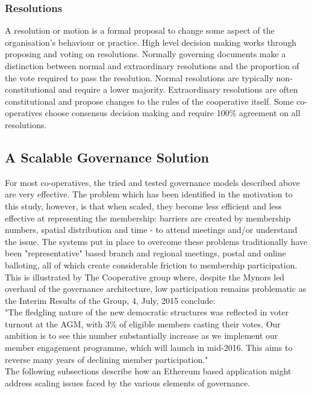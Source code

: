\subsubsection{Resolutions}
A resolution or motion is a formal proposal to change some aspect of the organisation's behaviour or practice. High level decision making works through proposing and voting on resolutions. Normally governing documents make a distinction between normal and extraordinary resolutions and the proportion of the vote required to pass the resolution. Normal resolutions are typically non-constitutional and require a lower majority. Extraordinary resolutions are often constitutional and propose changes to the rules of the cooperative itself. Some co-operatives choose consensus decision making and require 100\% agreement on all resolutions.

\subsection{A Scalable Governance Solution}
For most co-operatives, the tried and tested governance models described above are very effective. The problem which has been identified in the motivation to this study, however, is that when scaled, they become less efficient and less effective at representing the membership: barriers are created by membership numbers, spatial distribution and time -  to attend meetings and/or understand the issue.  The systems put in place to overcome these problems traditionally have been "representative" based branch and regional meetings, postal and online balloting, all of which create considerable friction to membership participation. This is illustrated by The Cooperative group where, despite the Mynors led overhaul\cite{Myners} of the governance architecture, low participation remains problematic as the Interim Results of the Group, 4, July, 2015 conclude:\\

"The fledgling nature of the new democratic structures was reflected in voter turnout at the AGM, with  3\% of eligible members casting their votes. Our ambition is to see this number substantially increase as we implement our member engagement programme, which will launch in mid-2016. This aims to reverse many years of declining member participation."\cite{CoopParticipation}\\

The following subsections describe how an Ethereum based application might address scaling issues faced by the various elements of governance.\\


